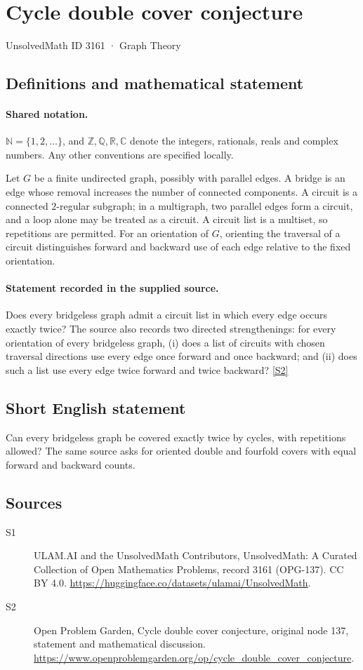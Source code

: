 \documentclass[11pt]{article}
\newcommand{\sref}[2]{\hyperlink{source:#1:#2}{[S#2]}}
\begin{document}
\setcounter{section}{3160}
\section{Cycle double cover conjecture}\label{3161}
{\small\sffamily UnsolvedMath ID 3161 · Graph Theory}
\subsection{Definitions and mathematical statement}

\paragraph{Shared notation.}$\mathbb N=\{1,2,\ldots\}$, and $\mathbb Z,\mathbb Q,\mathbb R,\mathbb C$ denote the integers, rationals, reals and complex numbers. Any other conventions are specified locally.


Let $G$ be a finite undirected graph, possibly with parallel edges. A bridge is an edge whose removal increases the number of connected components. A circuit is a connected $2$-regular subgraph; in a multigraph, two parallel edges form a circuit, and a loop alone may be treated as a circuit. A circuit list is a multiset, so repetitions are permitted. For an orientation of $G$, orienting the traversal of a circuit distinguishes forward and backward use of each edge relative to the fixed orientation.
\paragraph{Statement recorded in the supplied source.}
Does every bridgeless graph admit a circuit list in which every edge occurs exactly twice? The source also records two directed strengthenings: for every orientation of every bridgeless graph, (i) does a list of circuits with chosen traversal directions use every edge once forward and once backward; and (ii) does such a list use every edge twice forward and twice backward? \sref{3161}{2}
\subsection{Short English statement}
Can every bridgeless graph be covered exactly twice by cycles, with repetitions allowed? The same source asks for oriented double and fourfold covers with equal forward and backward counts.
\subsection{Sources}
\begin{description}
\item[\hypertarget{source:3161:1}{S1}] ULAM.AI and the UnsolvedMath Contributors, UnsolvedMath: A Curated Collection of Open Mathematics Problems, record 3161 (OPG-137). CC BY 4.0. \url{https://huggingface.co/datasets/ulamai/UnsolvedMath}.
\item[\hypertarget{source:3161:2}{S2}] Open Problem Garden, Cycle double cover conjecture, original node 137, statement and mathematical discussion. \url{https://www.openproblemgarden.org/op/cycle_double_cover_conjecture}.
\end{description}
\label{end:3161}
\end{document}
